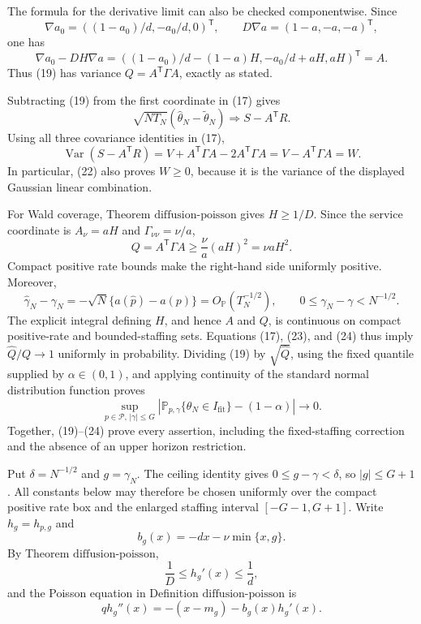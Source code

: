 The formula for the derivative limit can also be checked componentwise.  Since
\[
 \nabla a_0=((1-a_0)/d,-a_0/d,0)^{\mathsf T},
 \qquad
 D\nabla a=(1-a,-a,-a)^{\mathsf T},
\]
one has
\[
 \nabla a_0-DH\nabla a
 =((1-a_0)/d-(1-a)H,-a_0/d+aH,aH)^{\mathsf T}=A.                \tag{20}
\]
Thus (19) has variance \(Q=A^{\mathsf T}\Gamma A\), exactly as stated.

Subtracting (19) from the first coordinate in (17) gives
\[
 \sqrt{NT_N}(\widehat\theta_N-\widetilde\theta_N)
 \Rightarrow S-A^{\mathsf T}R.                                  \tag{21}
\]
Using all three covariance identities in (17),
\[
 \operatorname{Var}(S-A^{\mathsf T}R)
 =V+A^{\mathsf T}\Gamma A-2A^{\mathsf T}\Gamma A
 =V-A^{\mathsf T}\Gamma A=W.                                  \tag{22}
\]
In particular, (22) also proves \(W\geq0\), because it is the variance of the displayed Gaussian linear combination.

For Wald coverage, Theorem \(\mathrm{diffusion\mbox{-}poisson}\) gives \(H\geq1/D\).  Since the service coordinate is \(A_\nu=aH\) and \(\Gamma_{\nu\nu}=\nu/a\),
\[
 Q=A^{\mathsf T}\Gamma A\geq\frac{\nu}{a}(aH)^2=\nu aH^2.     \tag{23}
\]
Compact positive rate bounds make the right-hand side uniformly positive.  Moreover,
\[
 \widehat\gamma_N-\gamma_N
 =-\sqrt N\{a(\widehat p)-a(p)\}=O_{\mathbb P}(T_N^{-1/2}),
 \qquad 0\leq\gamma_N-\gamma<N^{-1/2}.                          \tag{24}
\]
The explicit integral defining \(H\), and hence \(A\) and \(Q\), is continuous on compact positive-rate and bounded-staffing sets.  Equations (17), (23), and (24) thus imply
\(\widehat Q/Q\to1\) uniformly in probability.  Dividing (19) by \(\sqrt{\widehat Q}\), using the fixed quantile supplied by \(\alpha\in(0,1)\), and applying continuity of the standard normal distribution function proves
\[
 \sup_{p\in\mathcal P,\,|\gamma|\leq G}
 \left|\mathbb P_{p,\gamma}\{\theta_N\in I_{\mathrm{fit}}\}-(1-\alpha)\right|\longrightarrow0.
\]
Together, (19)--(24) prove every assertion, including the fixed-staffing correction and the absence of an upper horizon restriction.

Put \(\delta=N^{-1/2}\) and \(g=\gamma_N\).  The ceiling identity gives
\(0\leq g-\gamma<\delta\), so \(|g|\leq G+1\).  All constants below may therefore be chosen uniformly over the compact positive rate box and the enlarged staffing interval \([-G-1,G+1]\).  Write \(h_g=h_{p,g}\) and
\[
 b_g(x)=-dx-\nu\min\{x,g\}.
\]
By Theorem \(\mathrm{diffusion\mbox{-}poisson}\),
\[
 \frac1D\leq h_g'(x)\leq\frac1d,                               \tag{25}
\]
and the Poisson equation in Definition \(\mathrm{diffusion\mbox{-}poisson}\) is
\[
 qh_g''(x)=-(x-m_g)-b_g(x)h_g'(x).                              \tag{26}
\]

